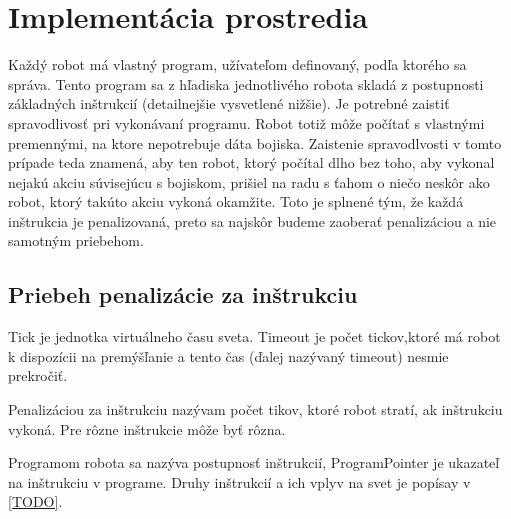 \chapter{Implementácia prostredia}
Každý robot má vlastný program, užívateľom definovaný, podľa ktorého sa správa. Tento program sa z hľadiska jednotlivého robota skladá z postupnosti základných inštrukcií (detailnejšie vysvetlené nižšie). Je potrebné zaistiť spravodlivosť pri vykonávaní programu. Robot totiž môže počítať s vlastnými premennými, na ktore nepotrebuje dáta bojiska. Zaistenie spravodlvosti v tomto prípade teda znamená, aby ten robot, ktorý počítal dlho bez toho, aby vykonal nejakú akciu súvisejúcu s bojiskom, prišiel na radu s ťahom o niečo neskôr ako robot, ktorý takúto akciu vykoná okamžite. Toto je splnené tým, že každá inštrukcia je penalizovaná, preto sa najskôr budeme zaoberať penalizáciou a nie samotným priebehom.
\section{Priebeh penalizácie za inštrukciu}
\begin{definicia}
Tick je jednotka virtuálneho času sveta. Timeout je počet tickov,ktoré má robot k dispozícii na premýšľanie a tento čas (ďalej nazývaný timeout) nesmie prekročiť.
\end{definicia}

\begin{definicia}
Penalizáciou za inštrukciu nazývam počet tikov, ktoré robot stratí, ak inštrukciu vykoná. Pre rôzne inštrukcie môže byť rôzna.
\end{definicia}

\begin{definicia}
Programom robota sa nazýva postupnosť inštrukcií, ProgramPointer je ukazateľ na inštrukciu v programe. Druhy inštrukcií a ich vplyv na svet je popísay v \ref{TODO}.
\end{definicia}

